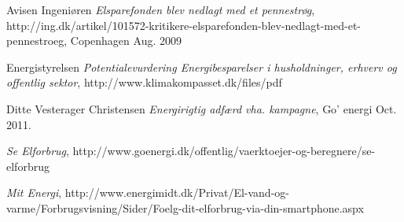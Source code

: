 \documentclass[journal]{IEEEtran}
\begin{document}
\begin{thebibliography}{1}
Avisen Ingeniøren \emph{Elsparefonden blev nedlagt med et pennestrøg}, \relax 
http://ing.dk/artikel/101572-kritikere-elsparefonden-blev-nedlagt-med-et-pennestroeg, Copenhagen Aug. 2009

Energistyrelsen \emph{Potentialevurdering Energibesparelser i husholdninger, erhverv og offentlig sektor}, \relax http://www.klimakompasset.dk/files/pdf


Ditte Vesterager Christensen \emph{Energirigtig adfærd vha. kampagne}, \relax Go' energi Oct. 2011.

\emph{Se Elforbrug}, \relax http://www.goenergi.dk/offentlig/vaerktoejer-og-beregnere/se-elforbrug

\emph{Mit Energi}, \relax 
http://www.energimidt.dk/Privat/El-vand-og-varme/Forbrugsvisning/Sider/Foelg-dit-elforbrug-via-din-smartphone.aspx 

\end{thebibliography}




\end{document}
